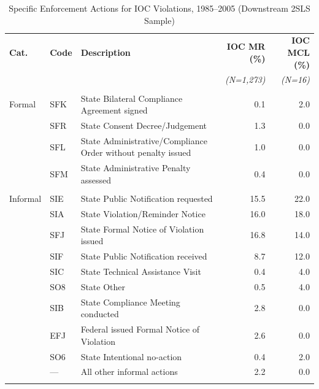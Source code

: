 


\begin{table}[htbp]
\centering
\caption{Specific Enforcement Actions for IOC Violations, 1985--2005 (Downstream 2SLS Sample)}
\label{tab:enf_action_type_ioc_dwnstrm}
\small
\begin{tabular}{llp{6.5cm}rr}
\hline\hline
\textbf{Cat.} & \textbf{Code} & \textbf{Description} & \textbf{IOC MR (\%)} & \textbf{IOC MCL (\%)} \\
 & & & \textit{(N=1,273)} & \textit{(N=16)} \\
\hline
\addlinespace[4pt]
\multicolumn{5}{l}{\textit{Formal enforcement}} \\
\addlinespace[2pt]
Formal & SFK & State Bilateral Compliance Agreement signed & 0.1 & 2.0 \\
 & SFR & State Consent Decree/Judgement & 1.3 & 0.0 \\
 & SFL & State Administrative/Compliance Order without penalty issued & 1.0 & 0.0 \\
 & SFM & State Administrative Penalty assessed & 0.4 & 0.0 \\
\addlinespace[4pt]
\multicolumn{5}{l}{\textit{Informal enforcement}} \\
\addlinespace[2pt]
Informal & SIE & State Public Notification requested & 15.5 & 22.0 \\
 & SIA & State Violation/Reminder Notice & 16.0 & 18.0 \\
 & SFJ & State Formal Notice of Violation issued & 16.8 & 14.0 \\
 & SIF & State Public Notification received & 8.7 & 12.0 \\
 & SIC & State Technical Assistance Visit & 0.4 & 4.0 \\
 & SO8 & State Other & 0.5 & 4.0 \\
 & SIB & State Compliance Meeting conducted & 2.8 & 0.0 \\
 & EFJ & Federal issued Formal Notice of Violation & 2.6 & 0.0 \\
 & SO6 & State Intentional no-action & 0.4 & 2.0 \\
 & --- & All other informal actions & 2.2 & 0.0 \\
\addlinespace[4pt]
\multicolumn{5}{l}{\textit{Resolving (compliance achieved)}} \\

\end{tabular}
\end{table}
